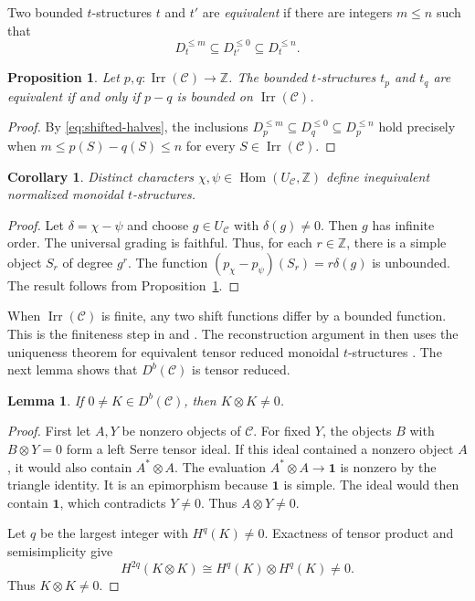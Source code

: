\documentclass[11pt]{amsart}
\newcommand{\C}{\mathcal C}
\newcommand{\one}{\mathbf 1}
\newcommand{\Irr}{\operatorname{Irr}}
\DeclareMathOperator{\Hom}{Hom}
\newtheorem{proposition}[theorem]{Proposition}
\newtheorem{lemma}[theorem]{Lemma}
\newtheorem{corollary}[theorem]{Corollary}
\theoremstyle{definition}
\theoremstyle{remark}
\theoremstyle{plain}
\begin{document}
Two bounded $t$-structures $t$ and $t'$ are \emph{equivalent} if there are integers $m\leq n$ such that
\[
D_t^{\leq m}\subseteq D_{t'}^{\leq0}\subseteq D_t^{\leq n}.
\]

\begin{proposition}\label{prop:uniform-comparison}
Let $p,q:\Irr(\C)\to\mathbb Z$. The bounded $t$-structures $t_p$ and $t_q$ are equivalent if and only if $p-q$ is bounded on $\Irr(\C)$.
\end{proposition}

\begin{proof}
By \eqref{eq:shifted-halves}, the inclusions $D_p^{\leq m}\subseteq D_q^{\leq0}\subseteq D_p^{\leq n}$ hold precisely when $m\leq p(S)-q(S)\leq n$ for every $S\in\Irr(\C)$.
\end{proof}

\begin{corollary}\label{cor:characters-not-comparable}
Distinct characters $\chi,\psi\in\Hom(U_{\C},\mathbb Z)$ define inequivalent normalized monoidal $t$-structures.
\end{corollary}

\begin{proof}
Let $\delta=\chi-\psi$ and choose $g\in U_{\C}$ with $\delta(g)\ne0$. Then $g$ has infinite order. The universal grading is faithful. Thus, for each $r\in\mathbb Z$, there is a simple object $S_r$ of degree $g^r$. The function $(p_\chi-p_\psi)(S_r)=r\delta(g)$ is unbounded. The result follows from Proposition~\ref{prop:uniform-comparison}.
\end{proof}

When $\Irr(\C)$ is finite, any two shift functions differ by a bounded function. This is the finiteness step in \cite[Lemma~4.3]{XuZheng} and \cite[Lemma~4.1]{Yu}. The reconstruction argument in \cite{XuZheng} then uses the uniqueness theorem for equivalent tensor reduced monoidal $t$-structures \cite[Theorem~2.23]{XuZheng}. The next lemma shows that $D^b(\C)$ is tensor reduced.

\begin{lemma}\label{lem:tensor-reduced}
If $0\ne K\in D^b(\C)$, then $K\otimes K\ne0$.
\end{lemma}

\begin{proof}
First let $A,Y$ be nonzero objects of $\C$. For fixed $Y$, the objects $B$ with $B\otimes Y=0$ form a left Serre tensor ideal. If this ideal contained a nonzero object $A$, it would also contain $A^*\otimes A$. The evaluation $A^*\otimes A\to\one$ is nonzero by the triangle identity. It is an epimorphism because $\one$ is simple. The ideal would then contain $\one$, which contradicts $Y\ne0$. Thus $A\otimes Y\ne0$.

Let $q$ be the largest integer with $H^q(K)\ne0$. Exactness of tensor product and semisimplicity give
\[
H^{2q}(K\otimes K)\cong H^q(K)\otimes H^q(K)\ne0.
\]
Thus $K\otimes K\ne0$.
\end{proof}
\end{document}

